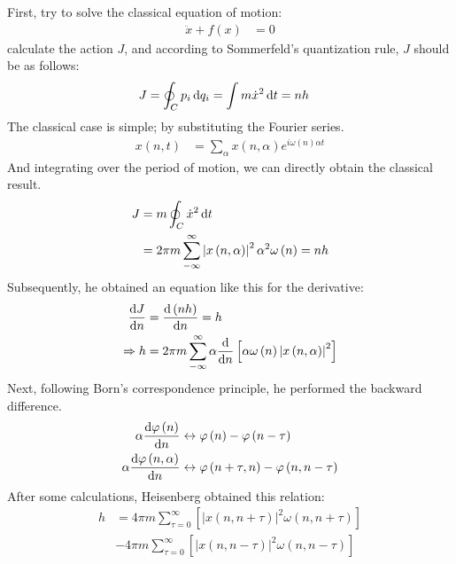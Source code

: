 \documentclass[a4paper, 12pt, oneside, onecolumn]{article}
\newcommand{\cald}{{\rm d}}
\begin{document}
\begin{multicols}{2}
First, try to solve the classical equation of motion:
\begin{align}
	\ddot x + f \left( x \right)
	&= 0
\end{align}
calculate the action $J$, and according to Sommerfeld's quantization rule, $J$ should be as follows: 
\begin{align}
	J
	&= \oint_C p_i \,\cald q_i = \int m \dot x^2 \,\cald t = n h
\end{align}
The classical case is simple; by substituting the Fourier series.
\begin{align}
	x \left(n, t \right)
	&= \sum_\alpha x \left(n, \alpha \right) e^{i \omega \left( n \right)\alpha t }
\end{align}
And integrating over the period of motion, we can directly obtain the classical result.
\begin{align}
	J
	&= m \oint_C \dot x^2 \,\cald t \nonumber \\
	&= 2 \pi m \sum_{- \infty}^{\infty} \left| x \left( n, \alpha \right) \right|^2 \alpha^2 \omega \left( n \right) = n h
\end{align}
Subsequently, he obtained an equation like this for the derivative:
\begin{align}
	\frac{\cald J}{\cald n}
	&= \frac{\cald \left( n h \right)}{\cald n} = h \\
	\Rightarrow h
	&= 2 \pi m \sum_{- \infty}^{\infty} \alpha \frac{\cald }{\cald n} \left[ \alpha \omega \left( n \right) \left| x \left( n, \alpha \right) \right|^2 \right]
\end{align}
Next, following Born's correspondence principle, he performed the backward difference.
\begin{align}
	\alpha \frac{\cald \varphi \left( n \right)}{\cald n}
	& \leftrightarrow \varphi \left( n \right) - \varphi \left( n - \tau \right) \\
	\alpha \frac{\cald \varphi \left( n, \alpha \right)}{\cald n}
	& \leftrightarrow \varphi \left( n + \tau, n \right) - \varphi \left( n, n - \tau \right)
\end{align}
After some calculations, Heisenberg obtained this relation:
\begin{align}
	h
	&= 4 \pi m \sum_{\tau = 0}^{\infty} \left[ \left| x \left( n, n + \tau \right) \right|^2 \omega \left( n, n + \tau \right) \right] \nonumber \\
	&- 4 \pi m \sum_{\tau = 0}^{\infty} \left[ \left| x \left( n, n - \tau \right) \right|^2 \omega \left( n, n - \tau \right) \right] \label{eq42}
\end{align}


\end{multicols}
\end{document}
